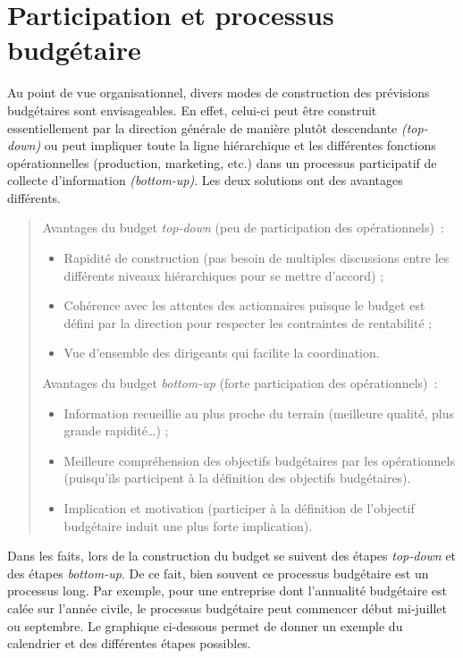 \documentclass{kaobook}
\begin{document}
\section{Participation et processus budgétaire}
\label{sec:orgf543f99}
Au point de vue organisationnel, divers modes de construction des prévisions budgétaires sont envisageables. En effet, celui-ci peut être construit essentiellement par la direction générale de manière plutôt descendante \emph{(top-down)} ou peut impliquer toute la ligne hiérarchique et les différentes fonctions opérationnelles (production, marketing, etc.) dans un processus participatif de collecte d'information \emph{(bottom-up)}. Les deux solutions ont des avantages différents.\\
\begin{quote}
Avantages du budget \emph{top-down} (peu de participation des opérationnels) :\\
\begin{itemize}
\item Rapidité de construction (pas besoin de multiples discussions entre les différents niveaux hiérarchiques pour se mettre d'accord) ;\\
\item Cohérence avec les attentes des actionnaires puisque le budget est défini par la direction pour respecter les contraintes de rentabilité ;\\
\item Vue d'ensemble des dirigeants qui facilite la coordination.\\
\end{itemize}
Avantages du budget \emph{bottom-up} (forte participation des opérationnels) :\\
\begin{itemize}
\item Information recueillie au plus proche du terrain (meilleure qualité, plus grande rapidité\ldots{}) ;\\
\item Meilleure compréhension des objectifs budgétaires par les opérationnels (puisqu'ils participent à la définition des objectifs budgétaires).\\
\item Implication et motivation (participer à la définition de l'objectif budgétaire induit une plus forte implication).\\
\end{itemize}
\end{quote}
Dans les faits, lors de la construction du budget se suivent des étapes \emph{top-down} et des étapes \emph{bottom-up}. De ce fait, bien souvent ce processus budgétaire est un processus long. Par exemple, pour une entreprise dont l'annualité budgétaire est calée sur l'année civile, le processus budgétaire peut commencer début mi-juillet ou septembre. Le graphique ci-dessous permet de donner un exemple du calendrier et des différentes étapes possibles.\\
\end{document}
